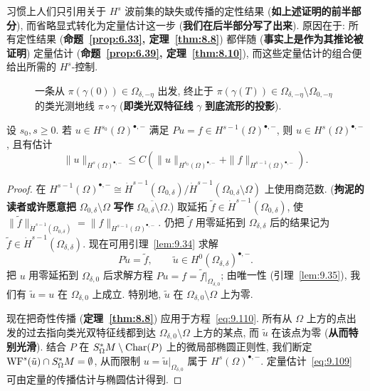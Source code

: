 习惯上人们只引用关于 $H^s$ 波前集的缺失或传播的定性结果 (\textbf{如上述证明的前半部分}), 而省略显式转化为定量估计这一步 (\textbf{我们在后半部分写了出来}). 原因在于: 所有定性结果 (\textbf{命题~\ref{prop:6.33}, 定理~\ref{thm:8.8}}) 都伴随 (\textbf{事实上是作为其推论被证明}) 定量估计 (\textbf{命题~\ref{prop:6.39}, 定理~\ref{thm:8.10}}), 而这些定量估计的组合便给出所需的 $H^s$-控制.

\begin{figure}[htbp]
\centering
\drawFigNineFour
\caption{一条从 $\pi(\gamma(0)) \in \Omega_{\delta,-\eta}$ 出发, 终止于 $\pi(\gamma(T)) \in \Omega_{\delta,-\eta} \setminus \Omega_{0,-\eta}$ 的类光测地线 $\pi \circ \gamma$ (\textbf{即类光双特征线} $\gamma$ \textbf{到底流形的投影}).}\label{fig:9.4}
\end{figure}

\begin{lemma}[更高正则性: $s \ge 0$]\label{lem:9.36}
设 $s_0, s \ge 0$. 若 $u \in H^{s_0}(\Omega)^{\bullet,-}$ 满足 $P u = f \in H^{s-1}(\Omega)^{\bullet,-}$, 则 $u \in H^s(\Omega)^{\bullet,-}$, 且有估计
\begin{equation}\label{eq:9.109}
    \|u\|_{H^s(\Omega)^{\bullet,-}} \le C \left( \|u\|_{H^{s_0}(\Omega)^{\bullet,-}} + \|f\|_{H^{s-1}(\Omega)^{\bullet,-}} \right).
\end{equation}
\end{lemma}

\begin{proof}
在 $H^{s-1}(\Omega)^{\bullet,-} \cong \dot{H}^{s-1}(\Omega_{0,\delta}) / \dot{H}^{s-1}(\Omega_{0,\delta} \setminus \Omega)$ 上使用商范数. (\textbf{拘泥的读者或许愿意把} $\Omega_{0,\delta} \setminus \Omega$ \textbf{写作} $\overline{\Omega_{0,\delta} \setminus \Omega}$.) 取延拓 $\tilde f \in \dot{H}^{s-1}(\Omega_{0,\delta})$, 使 $\|\tilde f\|_{\dot{H}^{s-1}(\Omega_{0,\delta})} = \|f\|_{H^{s-1}(\Omega)^{\bullet,-}}$. 仍把 $\tilde f$ 用零延拓到 $\Omega_{\delta,\delta}$ 后的结果记为 $\tilde f \in \dot{H}^{s-1}(\Omega_{\delta,\delta})$. 现在可用引理~\ref{lem:9.34} 求解
\begin{equation}\label{eq:9.110}
    P \tilde u = \tilde f, \qquad \tilde u \in H^0(\Omega_{\delta,\delta})^{\bullet,-}.
\end{equation}
把 $u$ 用零延拓到 $\Omega_{\delta,0}$ 后求解方程 $P u = f = \tilde f|_{\Omega_{\delta,0}}$; 由唯一性 (引理~\ref{lem:9.35}), 我们有 $\tilde u = u$ 在 $\Omega_{\delta,0}$ 上成立. 特别地, $\tilde u$ 在 $\Omega_{\delta,0} \setminus \Omega$ 上为零.

现在把奇性传播 (\textbf{定理~\ref{thm:8.8}}) 应用于方程~\eqref{eq:9.110}. 所有从 $\Omega$ 上方的点出发的过去指向类光双特征线都到达 $\Omega_{\delta,0} \setminus \Omega$ 上方的某点, 而 $\tilde u$ 在该点为零 (\textbf{从而特别光滑}). 结合 $P$ 在 $S_\Omega^* M \setminus \operatorname{Char}(P)$ 上的微局部椭圆正则性, 我们断定 $\operatorname{WF}^s(\tilde u) \cap S_\Omega^* M = \emptyset$, 从而限制 $u = \tilde u|_{\Omega_{\delta,0}}$ 属于 $H^s(\Omega)^{\bullet,-}$. 定量估计~\eqref{eq:9.109} 可由定量的传播估计与椭圆估计得到.
\end{proof}

